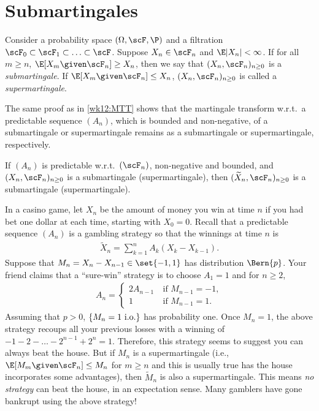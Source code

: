 \documentclass[../aipt.tex]{subfiles}
\begin{document}


\section{Submartingales}

\begin{Definition}
Consider a probability space $(\Omega, \scF, \P)$ and a filtration $\scF_0 \subset \scF_1 \subset \ldots \subset \scF$. Suppose $X_n \in \scF_n$ and $\E|X_n|<\infty$. If for all $m\geq n$, $\E[X_m \given \scF_n] \geq X_n$, then we say that $(X_n,\scF_n)_{n\geq0}$ is a \emph{submartingale}. If $\E[X_m \given \scF_n] \leq X_n$, $(X_n,\scF_n)_{n\geq0}$ is called a \emph{supermartingale}.
\end{Definition}

The same proof as in \cref{wk12:MTT} shows that the martingale transform w.r.t.\ a predictable sequence $(A_n)$, which is bounded and non-negative, of a submartingale or supermartingale remains as a submartingale or supermartingale, respectively. 

\begin{Theorem}[MTT] \label{wk14:MTT}
If $(A_n)$ is predictable w.r.t.\ $(\scF_n)$, non-negative and bounded, and $(X_n,\scF_n)_{n\geq0}$ is a submartingale (supermartingale), then $(\widetilde{X}_n, \scF_n)_{n\geq0}$ is a submartingale (supermartingale).
\end{Theorem}

\begin{Example}
In a casino game, let $X_n$ be the amount of money you win at time $n$ if you had bet one dollar at each time, starting with $X_0=0$. Recall that a predictable sequence $(A_n)$ is a gambling strategy so that the winnings at time $n$ is 
\begin{align*}
\widetilde{X}_n = \sum_{k=1}^n A_k(X_k-X_{k-1}).
\end{align*}
Suppose that $M_n = X_n - X_{n-1} \in \set{-1,1}$ has distribution $\Bern{p}$. Your friend claims that a ``sure-win'' strategy is to choose $A_1=1$ and for $n\geq2$, 
\begin{align*}
A_n = \left\{
\begin{array}{ll}
2A_{n-1} &\ \text{if $M_{n-1}=-1$},\\
1 &\ \text{if $M_{n-1}=1$}.
\end{array} \right.
\end{align*}
Assuming that $p>0$, $\{M_n=1 \ \mathrm{i.o.}\}$ has probability one. Once $M_n=1$, the above strategy recoups all your previous losses with a winning of $-1-2 - \ldots - 2^{n-1} + 2^n = 1$. Therefore, this strategy seems to suggest you can always beat the house. But if $M_n$ is a supermartingale (i.e., $\E[M_m \given \scF_n] \leq M_n$ for $m\geq n$ and this is usually true has the house incorporates some advantages), then $\widetilde{M}_n$ is also a supermartingale. This means \emph{no strategy} can beat the house, in an expectation sense. Many gamblers have gone bankrupt using the above strategy! 
\end{Example}
\end{document}
